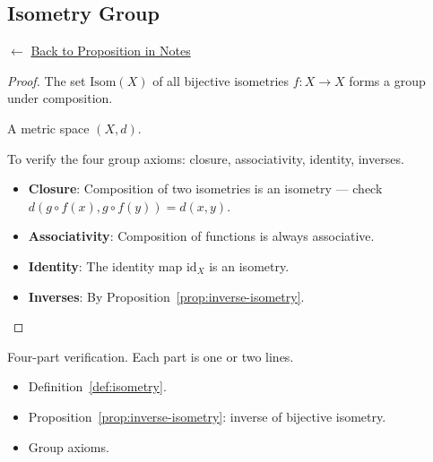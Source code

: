 
\subsection*{Isometry Group}
\label{prf:isometry-group}

\begin{remark*}[Return]
$\leftarrow$ \hyperref[prop:isometry-group]{Back to Proposition in Notes}
\end{remark*}

\begin{proof}
\Claim The set $\mathrm{Isom}(X)$ of all bijective isometries $f : X \to X$
forms a group under composition.

\Given A metric space $(X,d)$.

\Goal To verify the four group axioms: closure, associativity, identity, inverses.

\Strategy
\begin{itemize}
  \item \textbf{Closure}: Composition of two isometries is an isometry ---
        check $d(g \circ f(x), g \circ f(y)) = d(x,y)$.
  \item \textbf{Associativity}: Composition of functions is always associative.
  \item \textbf{Identity}: The identity map $\mathrm{id}_X$ is an isometry.
  \item \textbf{Inverses}: By Proposition~\ref{prop:inverse-isometry}.
\end{itemize}


\end{proof}

\begin{remark*}
Four-part verification. Each part is one or two lines.
\end{remark*}

\begin{remark*}[Dependencies]
\begin{itemize}
  \item Definition~\ref{def:isometry}.
  \item Proposition~\ref{prop:inverse-isometry}: inverse of bijective isometry.
  \item Group axioms.
\end{itemize}
\end{remark*}
